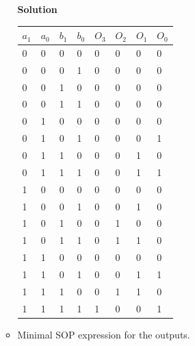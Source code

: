 \begin{enumerate}
\begin{itemize}
                \begin{onlysolution}  \textbf{Solution} \itshape{
                        \begin{tabular}{l|l|l|l||l|l|l|l}
                            $a_1$ & $a_0$ & $b_1$ & $b_0$ & $O_3$ & $O_2$ & $O_1$ & $O_0$ \\ \hline
                            0&0&0&0 &0&0&0&0 \\ \hline
                            0&0&0&1 &0&0&0&0 \\ \hline
                            0&0&1&0 &0&0&0&0 \\ \hline
                            0&0&1&1 &0&0&0&0 \\ \hline
                            0&1&0&0 &0&0&0&0 \\ \hline
                            0&1&0&1 &0&0&0&1 \\ \hline
                            0&1&1&0 &0&0&1&0 \\ \hline
                            0&1&1&1 &0&0&1&1 \\ \hline
                            1&0&0&0 &0&0&0&0 \\ \hline
                            1&0&0&1 &0&0&1&0 \\ \hline
                            1&0&1&0 &0&1&0&0 \\ \hline
                            1&0&1&1 &0&1&1&0 \\ \hline
                            1&1&0&0 &0&0&0&0 \\ \hline
                            1&1&0&1 &0&0&1&1 \\ \hline
                            1&1&1&0 &0&1&1&0 \\ \hline
                            1&1&1&1 &1&0&0&1 \\
                        \end{tabular}
                    }
                \end{onlysolution}

            \item Minimal SOP expression for the outputs.


\end{itemize}
\end{enumerate}
